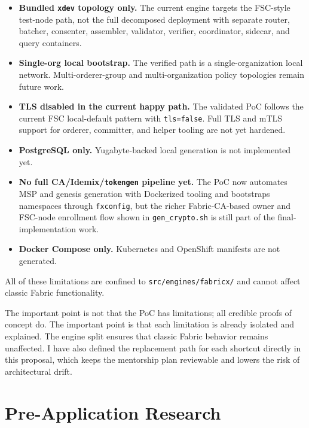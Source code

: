 \begin{tcolorbox}[colback=yellow!5!white, colframe=yellow!60!black,
  title=Known PoC Limitations (all isolated inside the new engine architecture),
  fonttitle=\bfseries, arc=4pt]
\begin{itemize}[leftmargin=*]
\item \textbf{Bundled \texttt{xdev} topology only.} The current engine targets the FSC-style test-node path, not the full decomposed deployment with separate router, batcher, consenter, assembler, validator, verifier, coordinator, sidecar, and query containers.
\item \textbf{Single-org local bootstrap.} The verified path is a single-organization local network. Multi-orderer-group and multi-organization policy topologies remain future work.
\item \textbf{TLS disabled in the current happy path.} The validated PoC follows the current FSC local-default pattern with \texttt{tls=false}. Full TLS and mTLS support for orderer, committer, and helper tooling are not yet hardened.
\item \textbf{PostgreSQL only.} Yugabyte-backed local generation is not implemented yet.
\item \textbf{No full CA/Idemix/\texttt{tokengen} pipeline yet.} The PoC now automates MSP and genesis generation with Dockerized tooling and bootstraps namespaces through \texttt{fxconfig}, but the richer Fabric-CA-based owner and FSC-node enrollment flow shown in \texttt{gen\_crypto.sh} is still part of the final-implementation work.
\item \textbf{Docker Compose only.} Kubernetes and OpenShift manifests are not generated.
\end{itemize}
All of these limitations are confined to \texttt{src/engines/fabricx/} and cannot affect classic Fabric functionality.
\end{tcolorbox}

The important point is not that the PoC has limitations; all credible proofs of concept do. The important point is that each limitation is already isolated and explained. The engine split ensures that classic Fabric behavior remains unaffected. I have also defined the replacement path for each shortcut directly in this proposal, which keeps the mentorship plan reviewable and lowers the risk of architectural drift.

\section{Pre-Application Research}


